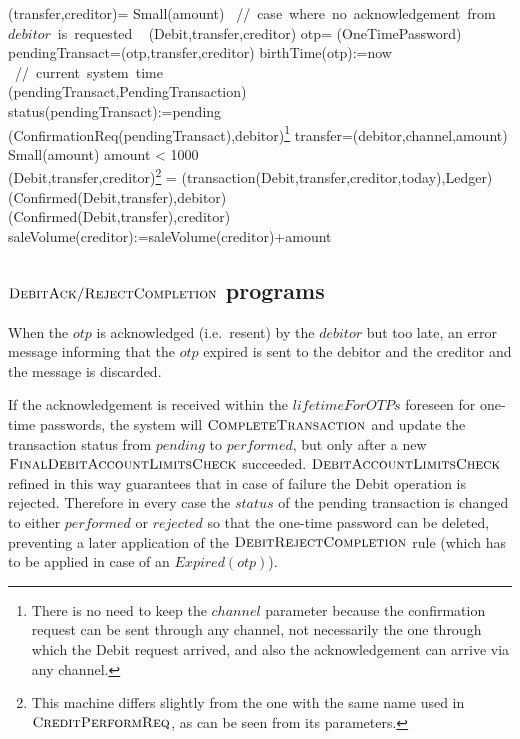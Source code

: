 \begin{asm}
(transfer,creditor)=\+
\IF Small(amount) 
\mbox{  // case where no acknowledgement from $debitor$ is requested}\+
   \THEN ~ (Debit,transfer,creditor) \-
   \ELSE \+
       \LET otp= \NEW(OneTimePassword)\\
       \LET pendingTransact=(otp,transfer,creditor)\+
          birthTime(otp):=now \mbox{ // current system time}\\
          (pendingTransact,PendingTransaction)\\ 
          status(pendingTransact):=pending \\
          (ConfirmationReq(pendingTransact),\TO debitor)\footnote{There is no need to keep the $channel$ parameter because the confirmation request can be sent through any channel, not necessarily the one through which the Debit request arrived, and also the acknowledgement can arrive via any channel.}
       \dec\-
\WHERE \+
transfer=(debitor,channel,amount)\\
Small(amount) \IFF amount < 1000 \\
 (Debit,transfer,creditor)\footnote{This machine differs slightly from the one with the same name used in $\hbox{\sc CreditPerformReq}$, as can be seen from its parameters.} =\+     
   (transaction(Debit,transfer,creditor,today),Ledger)\\
   (Confirmed(Debit,transfer),\TO debitor)\\
   (Confirmed(Debit,transfer),\TO creditor)\\
   saleVolume(creditor):=saleVolume(creditor)+amount
\end{asm}


\subsection{ $\hbox{\sc DebitAck/RejectCompletion}$ programs}
\label{sect:debitackreject}

When the $otp$ is acknowledged (i.e.\ resent) by the $debitor$ but too late, an error message informing that the $otp$ expired is sent to the debitor and the creditor and the message is discarded.

If the acknowledgement is received within the $lifetimeForOTPs$ foreseen for one-time passwords, the system will $\hbox{\sc CompleteTransaction}$ and update the transaction status from $pending$ to $performed$, but only after a new $\hbox{\sc FinalDebitAccountLimitsCheck}$ succeeded. $\hbox{\sc DebitAccountLimitsCheck}$  refined in this way guarantees that in case of failure the Debit operation is rejected. Therefore in every case the $status$ of the pending transaction is changed to either $performed$ or $rejected$ so that the one-time password can be deleted,  preventing a later application of the $\hbox{\sc DebitRejectCompletion}$ rule (which has to be applied in case of an $Expired(otp)$).



